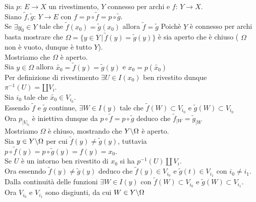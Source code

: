 \begin{prop}\bianco
Sia $p:\, E \to X $ un rivestimento, $Y$ connesso per archi e $f:\, Y \to X$.\\
Siano $\tilde{f}, \tilde{g}:\, Y \to E$ con $f=p\circ \tilde{f}=p \circ \tilde{g}$.\\
Se $\exists y_0 \in Y$ tale che $\tilde{f}(x_0)=\tilde{g}(x_0)$ allora $\tilde{f}=\tilde{g}$
\proof Poich\`e $Y$ \`e connesso per archi basta mostrare che $\Omega=\{ y \in Y \, \vert \, \tilde{f}(y)=\tilde{g}(y)\}$ \`e sia aperto che \`e chiuso ( $\Omega$ non \`e vuoto, dunque \`e tutto $Y$).\\
Mostriamo che $\Omega$ \`e aperto.\\
Sia $y\in \Omega$ allora $\tilde{x_0}=\tilde{f}(y)=\tilde{g}(y)$ e $x_0=p(\tilde{x_0})$\\
Per definizione di rivestimento $\exists U\in I(x_0)$ ben rivestito dunque $\pi^{-1}(U)=\amalg V_i$.\\
Sia $i_0$ tale che $\tilde{x_0}\in V_{i_0}$.\\
Essendo $\tilde{f}$ e $ \tilde{g}$ continue, $\exists W \in I(y)$ tale che $\tilde{f}(W)\subset V_{i_0}$ e $\tilde{g}(W)\subset V_{i_0}$\\
Ora $p_{\vert V_{i_0}}$ \`e iniettiva dunque da $p\circ \tilde{f}=p \circ \tilde{g}$ deduco che $\tilde{f}_{\vert W}= \tilde{g}_{\vert W}$\\
Mostriamo $\Omega$ \`e chiuso, mostrando che $Y \backslash \Omega$ \`e aperto.\\
Sia $y\in Y \backslash \Omega$ per cui $\tilde{f}(y) \neq \tilde{g}(y)$, tuttavia $p\circ \tilde{f}(y)=p \circ \tilde{g}(y)=f(y)=x_0$.\\
Se $U$ \`e un intorno ben rivestito di $x_0$ si ha $p^{-1}(U) \amalg V_i$.\\
Ora essenndo $\tilde{f}(y) \neq \tilde{g}(y)$ deduco che $\tilde{f}(y) \in V_{i_0}$ e $\tilde{g}(t) \in V_{i_1}$ con $i_0 \neq i_1$.\\
Dalla continuit\`a delle funzioni $\exists W \in I(y)$ con $\tilde{f}(W)\subset V_{i_0}$ e $\tilde{g}(W)\subset V_{i_1}$.\\
Ora $V_{i_0}$ e $V_{i_1}$ sono disgiunti, da cui $W \in Y \backslash \Omega$
\end{prop}
\spazio
